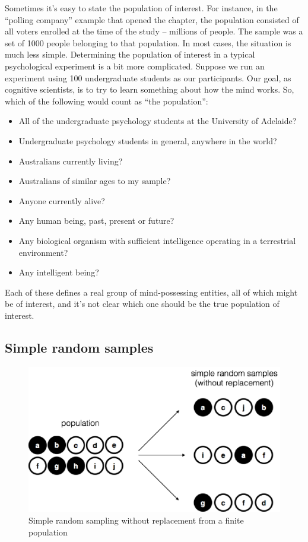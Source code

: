 \documentclass[
]{book}
\providecommand{\tightlist}{%
  \setlength{\itemsep}{0pt}\setlength{\parskip}{0pt}}
\theoremstyle{definition}
\theoremstyle{definition}
\theoremstyle{definition}
\theoremstyle{definition}
\theoremstyle{remark}
\begin{document}
Sometimes it's easy to state the population of interest. For instance, in the ``polling company'' example that opened the chapter, the population consisted of all voters enrolled at the time of the study -- millions of people. The sample was a set of 1000 people belonging to that population. In most cases, the situation is much less simple. Determining the population of interest in a typical psychological experiment is a bit more complicated. Suppose we run an experiment using 100 undergraduate students as our participants. Our goal, as cognitive scientists, is to try to learn something about how the mind works. So, which of the following would count as ``the population'':

\begin{itemize}
\tightlist
\item
  All of the undergraduate psychology students at the University of Adelaide?
\item
  Undergraduate psychology students in general, anywhere in the world?
\item
  Australians currently living?
\item
  Australians of similar ages to my sample?
\item
  Anyone currently alive?
\item
  Any human being, past, present or future?
\item
  Any biological organism with sufficient intelligence operating in a terrestrial environment?
\item
  Any intelligent being?
\end{itemize}

Each of these defines a real group of mind-possessing entities, all of which might be of interest, and it's not clear which one should be the true population of interest.

\hypertarget{simple-random-samples}{%
\subsection{Simple random samples}\label{simple-random-samples}}

\begin{figure}

{\centering \includegraphics[width=0.66\linewidth]{resources/image/srs1} 

}

\caption{Simple random sampling without replacement from a finite population}\label{fig:srs1}
\end{figure}
\end{document}
